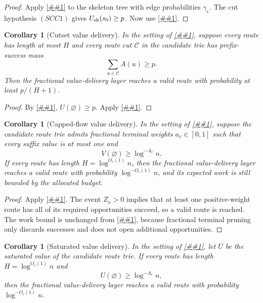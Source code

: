 \documentclass[10pt]{article}
\newcommand{\cref}[1]{\ref{##1}}
\newtheorem{corollary}[theorem]{Corollary}
\theoremstyle{definition}
\begin{document}
\begin{proof}
   Apply \cref{lem:saturated-value-mincut} to the skeleton tree with edge
   probabilities \(\gamma_e\).  The cut hypothesis \((SCC1)\) gives
   \(U_{\rm sk}(s_0)\ge p\).  Now use
   \cref{lem:port-skeleton-saturated-comparison}.
\end{proof}

\begin{corollary}[Cutset value delivery]\label{cor:cutset-value-delivery}
   In the setting of \cref{cor:fractional-value-delivery}, suppose every
   route has length at most $H$ and every route cut $\mathcal C$ in the
   candidate trie has prefix-success mass
   \[
      \sum_{u\in\mathcal C}A(u)\ge p .
   \]
   Then the fractional value-delivery layer reaches a valid route with
   probability at least $p/(H+1)$.
\end{corollary}

\begin{proof}
   By \cref{lem:saturated-value-mincut}, $U(\varnothing)\ge p$. Apply
   \cref{cor:saturated-value-delivery}.
\end{proof}

\begin{corollary}[Capped-flow value delivery]\label{cor:capped-flow-delivery}
   In the setting of \cref{cor:fractional-value-delivery}, suppose the
   candidate route trie admits fractional terminal weights $a_v\in[0,1]$ such
   that every suffix value is at most one and
   \[
      V(\varnothing)\ge\log^{-A_c}n .
   \]
   If every route has length $H=\log^{O_c(1)}n$, then the fractional
   value-delivery layer reaches a valid route with probability
   $\log^{-O_c(1)}n$, and its expected work is still bounded by the allocated
   budget.
\end{corollary}

\begin{proof}
   Apply \cref{lem:unit-capped-value-flow}. The event $Z_a>0$ implies that at
   least one positive-weight route has all of its required opportunities
   succeed, so a valid route is reached. The work bound is unchanged from
   \cref{cor:fractional-value-delivery}, because fractional terminal pruning
   only discards successes and does not open additional opportunities.
\end{proof}

\begin{corollary}[Saturated value delivery]\label{cor:saturated-value-delivery}
   In the setting of \cref{cor:fractional-value-delivery}, let $U$ be the
   saturated value of the candidate route trie. If every route has length
   $H=\log^{O_c(1)}n$ and
   \[
      U(\varnothing)\ge\log^{-A_c}n,
   \]
   then the fractional value-delivery layer reaches a valid route with
   probability $\log^{-O_c(1)}n$.
\end{corollary}
\end{document}

